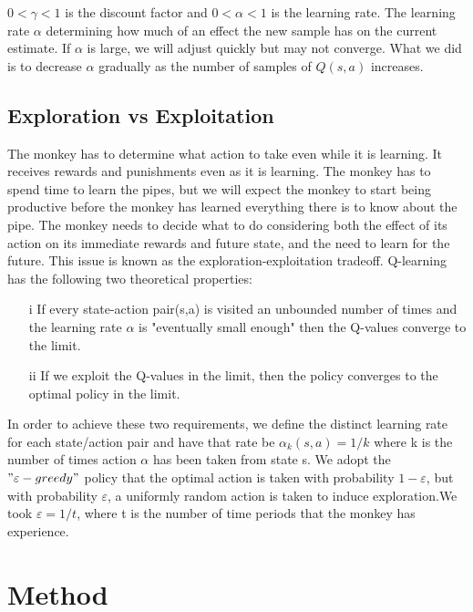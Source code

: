 \documentclass[11pt]{article}
\theoremstyle{definition}
\begin{document}
$0<\gamma<1$ is the discount factor and $0<\alpha<1$ is the learning rate. The learning rate $\alpha$ determining how much of an effect the new sample has on the current estimate. If $\alpha$ is large, we will adjust quickly but may not converge. What we did is to decrease $\alpha$ gradually as the number of samples of $Q(s,a)$ increases.


\subsection{\textbf{Exploration vs Exploitation}}
The monkey has to determine what action to take even while it is learning. It receives rewards and punishments even as it is learning. The monkey has to spend time to learn the pipes, but we will expect the monkey to start being productive before the monkey has learned everything there is to know about the pipe. The monkey needs to decide what to do considering both the effect of its action on its immediate rewards and future state, and the need to learn for the future. This issue is known as the exploration-exploitation tradeoff. Q-learning has the following two theoretical properties:
\begin{enumerate}
	\item [i] If every state-action pair(s,a) is visited an unbounded number of times and the learning rate $\alpha$ is "eventually small enough" then the Q-values converge to the limit.
	\item [ii] If we exploit the Q-values in the limit, then the policy converges to the optimal policy in the limit.
\end{enumerate}
In order to achieve these two requirements, we define the distinct learning rate for each state/action pair and have that rate be $\alpha_k(s,a)=1/k$ where k is the number of times action $\alpha$ has been taken from state s. We adopt the $"\varepsilon-greedy"$ policy that the optimal action is taken with probability $1-\varepsilon$, but with probability $\varepsilon$, a uniformly random action is taken to induce exploration.We took $\varepsilon=1/t$, where t is the number of time periods that the monkey has experience.








\section{\textbf{Method}}
\end{document}
